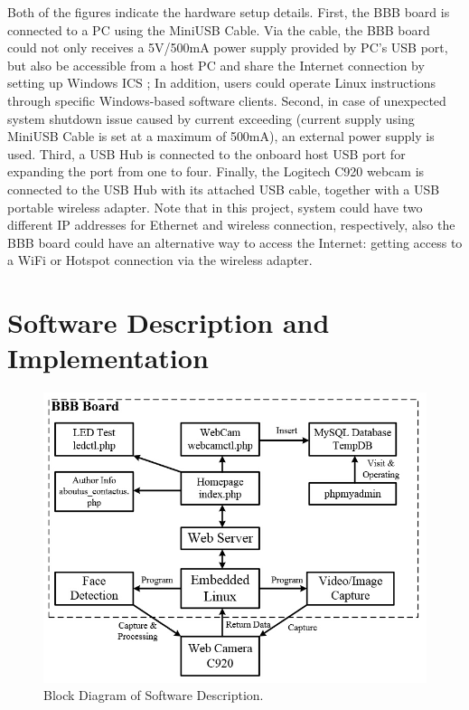 \documentclass[12pt,journal,draftclsnofoot,onecolumn]{IEEEtran}
\begin{document}
Both of the figures indicate the hardware setup details. First, the BBB board is connected to a PC using the MiniUSB Cable. Via the cable, the BBB board could not only receives a 5V/500mA power supply provided by PC's USB port, but also be accessible from a host PC and share the Internet connection by setting up Windows ICS \cite{windowsICS}; In addition, users could operate Linux instructions through specific Windows-based software clients. Second, in case of unexpected system shutdown issue caused by current exceeding (current supply using MiniUSB Cable is set at a maximum of 500mA), an external power supply is used. Third, a USB Hub is connected to the onboard host USB port for expanding the port from one to four. Finally, the Logitech C920 webcam is connected to the USB Hub with its attached USB cable, together with a USB portable wireless adapter. Note that in this project, system could have two different IP addresses for Ethernet and wireless connection, respectively, also the BBB board could have an alternative way to access the Internet: getting access to a WiFi or Hotspot connection via the wireless adapter.


\section{Software Description and Implementation}\label{SfDes}
\begin{figure}[ht]
	\centering
	\includegraphics[width=5in]{./figs/sw1.jpg}
	\caption{Block Diagram of Software Description.}
	\label{sw1}
\end{figure}
\end{document}
